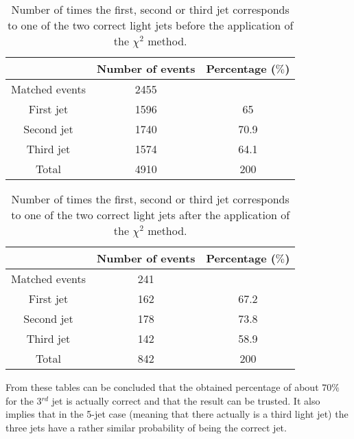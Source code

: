 \documentclass[a4paper,12pt]{report}
\begin{document}
\begin{table}[h!]
 \centering
 \begin{tabular}{c|c|c}
                 & Number of events & Percentage ($\%$) \\
  \hline
  Matched events & 2455 & \\
  \hline
  First jet      & 1596 & 65   \\
  Second jet     & 1740 & 70.9 \\
  Third jet      & 1574 & 64.1 \\
  \hline
  Total          & 4910 & 200
 \end{tabular}
 \caption{Number of times the first, second or third jet corresponds to one of the two correct light jets before the application of the $\chi^{2}$ method.}\label{table::FirstSecondThirdJetPerc}
\end{table}

\begin{table}[h!]
 \centering
 \begin{tabular}{c|c|c}
                 & Number of events & Percentage ($\%$) \\
  \hline
  Matched events & 241 & \\
  \hline
  First jet      & 162 & 67.2   \\
  Second jet     & 178 & 73.8 \\
  Third jet      & 142 & 58.9 \\
  \hline
  Total          & 842 & 200
 \end{tabular}
 \caption{Number of times the first, second or third jet corresponds to one of the two correct light jets after the application of the $\chi^{2}$ method.}\label{table::FirstSecondThirdJetPercMlb}
\end{table}

From these tables can be concluded that the obtained percentage of about $70\%$ for the 3$^{rd}$ jet is actually correct and that the result can be trusted. It also implies that in the 5-jet case (meaning that there actually is a third light jet) the three jets have a rather similar probability of being the correct jet.
\end{document}
